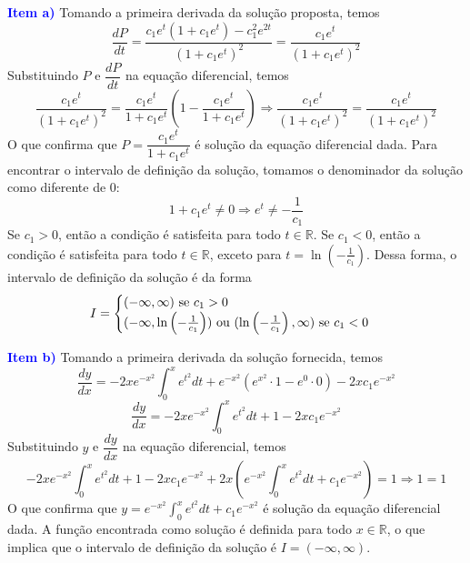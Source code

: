 \documentclass[oneside,12pt,a4paper]{report}
\begin{document}

        \begin{tcolorbox}[enhanced, breakable, colback=blue!1!white,colframe=blue!75!black,title=\textbf{\hyperlink{quest:ex4}{\hypertarget{resp:ex4}{Exercício 4}}}]

            \noindent \textcolor{blue}{\textbf{Item a)}} Tomando a primeira derivada da solução proposta, temos
            \[\frac{dP}{dt} = \frac{c_1e^t(1+c_1e^t)-c_1^2e^{2t}}{(1+c_1e^t)^2} = \frac{c_1e^t}{(1+c_1e^t)^2}\]
            \noindent Substituindo $P$ e $\dfrac{dP}{dt}$ na equação diferencial, temos
            \[\frac{c_1e^t}{(1+c_1e^t)^2} = \frac{c_1e^t}{1+c_1e^t}\left(1-\frac{c_1e^t}{1+c_1e^t}\right)\Rightarrow\boxed{\frac{c_1e^t}{(1+c_1e^t)^2} = \frac{c_1e^t}{(1+c_1e^t)^2}}\]
            \noindent O que confirma que $P = \dfrac{c_1e^t}{1 + c_1e^t}$ é solução da equação diferencial dada. Para encontrar o intervalo de definição da solução, tomamos o denominador da solução como diferente de $0$:
            \[1+c_1e^t \neq 0\Rightarrow e^t \neq -\frac{1}{c_1}\]
            Se $c_1 > 0$, então a condição é satisfeita para todo $t \in \mathbb{R}$. Se $c_1 < 0$, então a condição é satisfeita para todo $t \in \mathbb{R}$, exceto para $t = \ln\left(-\frac{1}{c_1}\right)$. Dessa forma, o intervalo de definição da solução é da forma
            \begin{equation*}
            I=\begin{cases}
                (-\infty, \infty)$ se $c_1 > 0\\
                (-\infty, \ln\left(-\frac{1}{c_1}\right)) \text{ ou } (\ln\left(-\frac{1}{c_1}\right), \infty)$ se $c_1 < 0
            \end{cases}
            \end{equation*}

            \noindent \textcolor{blue}{\textbf{Item b)}} Tomando a primeira derivada da solução fornecida, temos
            \[\frac{dy}{dx} = -2xe^{-x^2}\int_{0}^{x} e^{t^2} dt+e^{-x^2}(e^{x^2}\cdot1-e^0\cdot0)-2xc_1e^{-x^2}\]
            \[\frac{dy}{dx} = -2xe^{-x^2}\int_{0}^{x} e^{t^2} dt+1-2xc_1e^{-x^2}\]
            \noindent Substituindo $y$ e $\dfrac{dy}{dx}$ na equação diferencial, temos
            \[-2xe^{-x^2}\int_{0}^{x} e^{t^2} dt+1-2xc_1e^{-x^2}+2x\left(e^{-x^2}\int_{0}^{x} e^{t^2} dt+c_1e^{-x^2}\right) = 1\Rightarrow\boxed{1=1}\]
            \noindent O que confirma que $y = e^{-x^2} \displaystyle\int_0^x e^{t^2} dt + c_1e^{-x^2}$ é solução da equação diferencial dada. A função encontrada como solução é definida para todo $x \in \mathbb{R}$, o que implica que o intervalo de definição da solução é $I=(-\infty, \infty)$.
        \end{tcolorbox}
\end{document}
